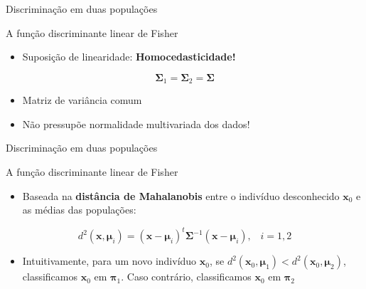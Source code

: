 \documentclass[
  ignorenonframetext,
  aspectratio=169,
]{beamer}
\providecommand{\tightlist}{%
  \setlength{\itemsep}{0pt}\setlength{\parskip}{0pt}}
\begin{document}
\begin{frame}{Discriminação em duas populações}
\label{discriminauxe7uxe3o-em-duas-populauxe7uxf5es}
\begin{block}{A função discriminante linear de Fisher}
\label{a-funuxe7uxe3o-discriminante-linear-de-fisher}
\begin{itemize}
\tightlist
\item
  Suposição de linearidade: \textbf{Homocedasticidade!}
\end{itemize}

\[\boldsymbol{\Sigma}_1 = \boldsymbol{\Sigma}_2 = \boldsymbol{\Sigma}\]

\begin{itemize}
\item
  Matriz de variância comum
\item
  Não pressupõe normalidade multivariada dos dados!
\end{itemize}
\end{block}
\end{frame}

\begin{frame}{Discriminação em duas populações}
\label{discriminauxe7uxe3o-em-duas-populauxe7uxf5es-1}
\begin{block}{A função discriminante linear de Fisher}
\label{a-funuxe7uxe3o-discriminante-linear-de-fisher-1}
\begin{itemize}
\tightlist
\item
  Baseada na \textbf{distância de Mahalanobis} entre o indivíduo
  desconhecido \(\boldsymbol{x}_0\) e as médias das populações:
\end{itemize}

\[d^2(\boldsymbol{x}, \boldsymbol{\mu}_i) = (\boldsymbol{x} - \boldsymbol{\mu}_i)^t \boldsymbol{\Sigma}^{-1}(\boldsymbol{x} - \boldsymbol{\mu}_i), \,\,\,\,\, i = 1,2\]

\begin{itemize}
\tightlist
\item
  Intuitivamente, para um novo indivíduo \(\boldsymbol{x}_0\), se
  \(d^2(\boldsymbol{x}_0, \boldsymbol{\mu}_1) < d^2(\boldsymbol{x}_0, \boldsymbol{\mu}_2)\),
  classificamos \(\boldsymbol{x}_0\) em \(\boldsymbol{\pi}_1\). Caso
  contrário, classificamos \(\boldsymbol{x}_0\) em
  \(\boldsymbol{\pi}_2\)
\end{itemize}
\end{block}
\end{frame}
\end{document}
